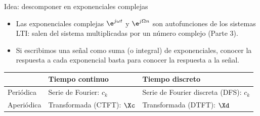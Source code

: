 \documentclass[aspectratio=169,11pt]{beamer}
\begin{document}
\begin{frame}{Idea: descomponer en exponenciales complejas}
  \begin{itemize}
    \item Las exponenciales complejas $\e^{j\omega t}$ y $\e^{j\Omega n}$ son \alert{autofunciones} de los sistemas LTI: salen del sistema multiplicadas por un número complejo (Parte 3).
    \item Si escribimos una señal como suma (o integral) de exponenciales, conocer la respuesta a cada exponencial basta para conocer la respuesta a la señal.
  \end{itemize}
  \begin{center}
    \renewcommand{\arraystretch}{1.3}
    \begin{tabular}{@{}lll@{}}
      \toprule
      & Tiempo continuo & Tiempo discreto\\\midrule
      Periódica & Serie de Fourier: $c_k$ & Serie de Fourier discreta (DFS): $c_k$\\
      Aperiódica & Transformada (CTFT): $\Xc$ & Transformada (DTFT): $\Xd$\\\bottomrule
    \end{tabular}
  \end{center}
\end{frame}
\end{document}
